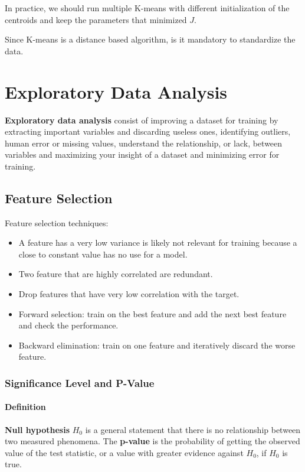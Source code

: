\documentclass[12pt]{report}
\begin{document}
            In practice, we should run multiple K-means with different initialization of the centroids and keep the parameters that minimized $J$.

            Since K-means is a distance based algorithm, is it mandatory to standardize the data. 
            
            
            
\chapter{Exploratory Data Analysis}
    \textbf{Exploratory data analysis} consist of improving a dataset for training by extracting important variables and discarding useless ones, identifying outliers, human error or missing values, understand the relationship, or lack, between variables and maximizing your insight of a dataset and minimizing error for training.
    
    
    \section{Feature Selection}
        Feature selection techniques:
        \begin{itemize}
            \item A feature has a very low variance is likely not relevant for training because a close to constant value has no use for a model.
            \item Two feature that are highly correlated are redundant.
            \item Drop features that have very low correlation with the target.
            \item Forward selection: train on the best feature and add the next best feature and check the performance.
            \item Backward elimination: train on one feature and iteratively discard the worse feature.
        \end{itemize}
    
        \subsection{Significance Level and P-Value}
            \subsubsection{Definition}
                \textbf{Null hypothesis} $H_0$ is a general statement that there is no relationship between two measured phenomena. The \textbf{p-value} is the probability of getting the observed value of the test statistic, or a value with greater evidence against $H_0$, if $H_0$ is true.
                
\end{document}
